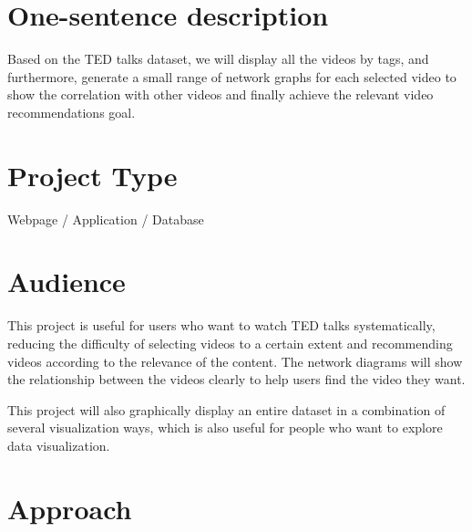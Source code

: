 \documentclass{proc}
\begin{document}
\section{One-sentence description}

Based on the TED talks dataset, we will display all the videos by tags, and furthermore, generate a small range of network graphs for each selected video to show the correlation with other videos and finally achieve the relevant video recommendations goal.

\section{Project Type}

Webpage / Application / Database

\section{Audience} 

This project is useful for users who want to watch TED talks systematically, reducing the difficulty of selecting videos to a certain extent and recommending videos according to the relevance of the content. The network diagrams will show the relationship between the videos clearly to help users find the video they want.

This project will also graphically display an entire dataset in a combination of several visualization ways, which is also useful for people who want to explore data visualization.

\section{Approach}
\end{document}
